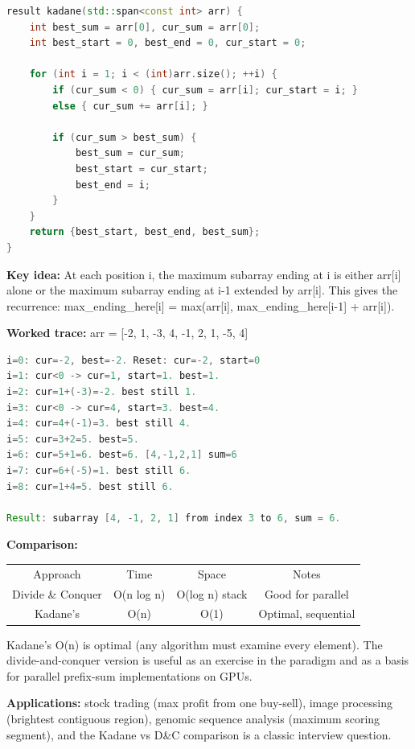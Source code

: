 \begin{lstlisting}[language=C++]
result kadane(std::span<const int> arr) {
    int best_sum = arr[0], cur_sum = arr[0];
    int best_start = 0, best_end = 0, cur_start = 0;

    for (int i = 1; i < (int)arr.size(); ++i) {
        if (cur_sum < 0) { cur_sum = arr[i]; cur_start = i; }
        else { cur_sum += arr[i]; }

        if (cur_sum > best_sum) {
            best_sum = cur_sum;
            best_start = cur_start;
            best_end = i;
        }
    }
    return {best_start, best_end, best_sum};
}
\end{lstlisting}

\textbf{Key idea:} At each position i, the maximum subarray ending at i is either arr[i] alone or the maximum subarray ending at i-1 extended by arr[i]. This gives the recurrence: max\_ending\_here[i] = max(arr[i], max\_ending\_here[i-1] + arr[i]).

\textbf{Worked trace:} arr = [-2, 1, -3, 4, -1, 2, 1, -5, 4]

\begin{lstlisting}[language=Java]
i=0: cur=-2, best=-2. Reset: cur=-2, start=0
i=1: cur<0 -> cur=1, start=1. best=1.
i=2: cur=1+(-3)=-2. best still 1.
i=3: cur<0 -> cur=4, start=3. best=4.
i=4: cur=4+(-1)=3. best still 4.
i=5: cur=3+2=5. best=5.
i=6: cur=5+1=6. best=6. [4,-1,2,1] sum=6
i=7: cur=6+(-5)=1. best still 6.
i=8: cur=1+4=5. best still 6.

Result: subarray [4, -1, 2, 1] from index 3 to 6, sum = 6.
\end{lstlisting}

\textbf{Comparison:}

\begin{center}
\begin{tabular}{cccc}
\toprule
Approach & Time & Space & Notes \\
Divide \& Conquer & O(n log n) & O(log n) stack & Good for parallel \\
Kadane's & O(n) & O(1) & Optimal, sequential \\
\bottomrule
\end{tabular}
\end{center}

Kadane's O(n) is optimal (any algorithm must examine every element). The divide-and-conquer version is useful as an exercise in the paradigm and as a basis for parallel prefix-sum implementations on GPUs.

\textbf{Applications:} stock trading (max profit from one buy-sell), image processing (brightest contiguous region), genomic sequence analysis (maximum scoring segment), and the Kadane vs D\&C comparison is a classic interview question.

